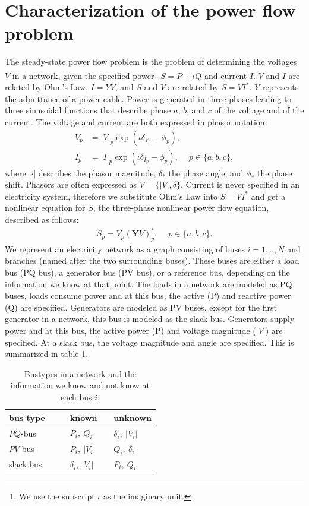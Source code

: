 \documentclass[10pt,journal]{article}
\begin{document}
\section{Characterization of the power flow problem}
The steady-state power flow problem is the problem of determining the voltages $V$ in a network, given the specified power\footnote{We use the subscript $\iota$ as the imaginary unit.} $S=P+\iota Q$ and current $I$. $V$ and $I$ are related by Ohm's Law, $I = YV$, and $S$ and $V$ are related by $S=VI^*$. $Y$ represents the admittance of a power cable. Power is generated in three phases leading to three sinusoidal functions that describe phase $a$, $b$, and $c$ of the voltage and of the current. The voltage and current are both expressed in phasor notation: 
   \begin{align}
    V_p &=|V|_p\exp{(\iota\delta_{V_p}-\phi_{p})},\\
    I_p &=|I|_p\exp{(\iota\delta_{I_p}-\phi_{p})},\quad\ p\in\{a,b,c\},
    \end{align}
where $|\cdot|$ describes the phasor magnitude, $\delta_*$ the phase angle, and $\phi_*$ the phase shift. Phasors are often expressed as $V=\{|V|,\delta\}$. 
Current is never specified in an electricity system, therefore we substitute Ohm's Law into $S=VI^*$ and get a nonlinear equation for $S$, the three-phase nonlinear power flow equation, described as follows:  
\begin{align}
    S_p=V_p(\mathbf{Y}V)_p^*,\quad\ p\in\{a,b,c\}.
    \label{eq:SVYVp}
\end{align}
We represent an electricity network as a graph consisting of buses $i=1,..,N$ and branches (named after the two surrounding buses). These buses are either a load bus (PQ bus), a generator bus (PV bus), or a reference bus, depending on the information we know at that point. The loads in a network are modeled as PQ buses, loads consume power and at this bus, the active (P) and reactive power (Q) are specified.  Generators are modeled as PV buses, except for the first generator in a network, this bus is modeled as the slack bus. Generators supply power and at this bus, the active power (P) and voltage magnitude ($|V|$) are specified. At a slack bus, the voltage magnitude and angle are specified. This is summarized in table \ref{tab:networknodes}. 
\begin{table}[htbp]
\centering
\caption{Bustypes in a network and the information we know and not know at each bus $i$. }
\label{tab:networknodes}
\begin{tabular}{llllll}
\toprule
bus type  &&& \multicolumn{1}{c}{known} && \multicolumn{1}{c}{unknown} \\ \hline
$PQ$-bus  &&& $P_i,\ Q_i$               && $\delta_i,\ |V_i|$          \\
$PV$-bus  &&& $P_i,\ |V_i|$             && $Q_i,\ \delta_i$            \\
slack bus &&& $\delta_i,\ |V_i|$        && $P_i,\ Q_i$          \\      
\toprule
\end{tabular}
\end{table}
\end{document}
